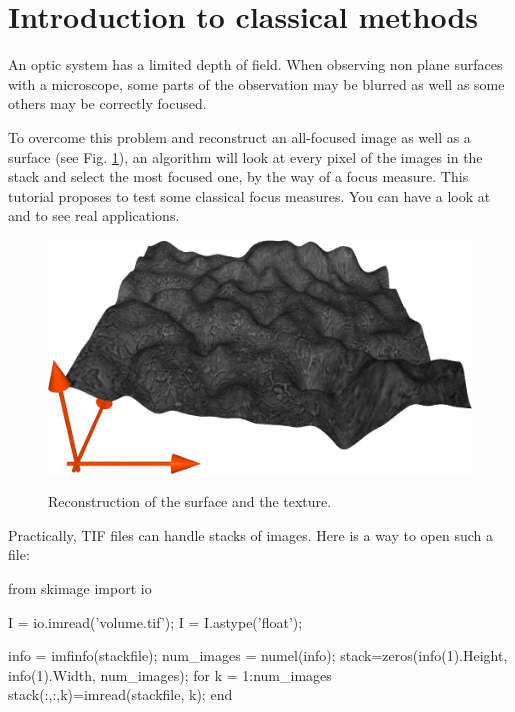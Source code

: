\section{Introduction to classical methods}
An optic system has a limited depth of field. When observing non plane surfaces with a microscope, some parts of the observation may be blurred as well as some others may be correctly focused. 

To overcome this problem and reconstruct an all-focused image as well as a surface (see Fig. \ref{fig:surface}), an algorithm will look at every pixel of the images in the stack and select the most focused one, by the way of a focus measure. This tutorial proposes to test some classical focus measures. You can have a look at \cite{Fernandes2010} and \cite{Fernandes2012} to see real applications.

\begin{figure}[htbp]
\centering\caption{Reconstruction of the surface and the texture.}%
\vspace*{1pt}%
 \includegraphics[width=0.75\linewidth]{meshc.png}%
 \vspace*{1pt}%
 \label{fig:surface}%
\end{figure}


Practically, TIF files can handle stacks of images. Here is a way to open such a file:


\begin{pcomment}
\begin{python}
from skimage import io

I = io.imread('volume.tif');
I = I.astype('float');
\end{python}
\end{pcomment}

\begin{mcomment}
\begin{matlab}
info = imfinfo(stackfile);
num_images = numel(info);
stack=zeros(info(1).Height, info(1).Width, num_images);
for k = 1:num_images
    stack(:,:,k)=imread(stackfile, k);
end
\end{matlab}
\end{mcomment}


